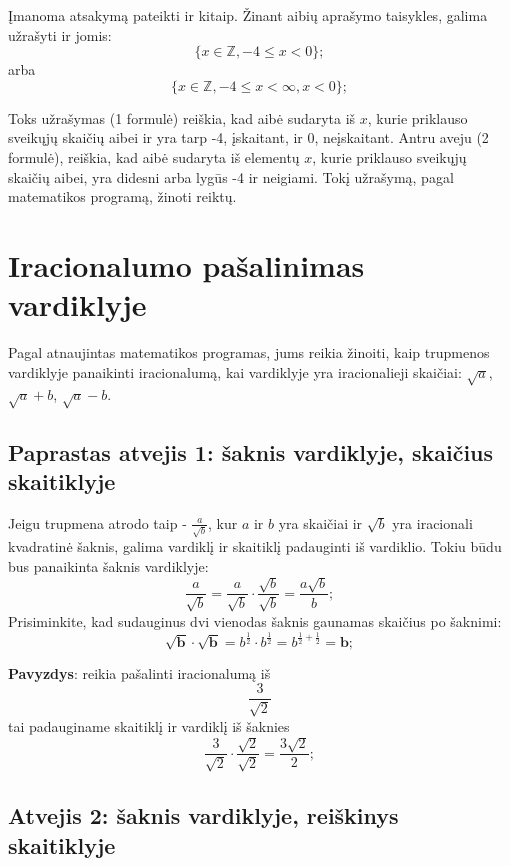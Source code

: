 \documentclass[a4paper]{article}
\begin{document}
Įmanoma atsakymą pateikti ir kitaip. Žinant aibių aprašymo taisykles, galima
užrašyti ir jomis:
\begin{equation}
      \{x \in \mathbb{Z}, -4 \leq x < 0\};
\end{equation}
arba
\begin{equation}
      \{x \in \mathbb{Z}, -4 \leq x < \infty, x < 0\};
\end{equation}

Toks užrašymas (1 formulė) reiškia, kad aibė sudaryta iš $x$, kurie priklauso
sveikųjų skaičių aibei ir yra tarp -4, įskaitant,
ir 0, neįskaitant. Antru aveju (2 formulė), reiškia, kad aibė sudaryta iš
elementų $x$, kurie priklauso sveikųjų skaičių aibei, yra didesni arba lygūs -4
ir neigiami. Tokį užrašymą, pagal matematikos programą, žinoti reiktų.

\section{Iracionalumo pašalinimas vardiklyje}

Pagal atnaujintas matematikos programas, jums reikia žinoiti, kaip trupmenos
vardiklyje panaikinti iracionalumą, kai vardiklyje yra iracionalieji skaičiai:
$\sqrt{a}$, $\sqrt{a}+b$, $\sqrt{a}-b$.

\subsection{Paprastas atvejis 1: šaknis vardiklyje, skaičius skaitiklyje}

Jeigu trupmena atrodo taip - $\frac{a}{\sqrt{b}}$, kur $a$ ir $b$ yra skaičiai
ir $\sqrt{b}$ yra iracionali kvadratinė šaknis, galima vardiklį ir skaitiklį
padauginti iš vardiklio. Tokiu būdu bus panaikinta šaknis vardiklyje:
\[\frac{a}{\sqrt{b}}=\frac{a}{\sqrt{b}}\cdot\frac{\sqrt{b}}{\sqrt{b}}=\frac{a\sqrt{b}}{b};\]
Prisiminkite, kad sudauginus dvi vienodas šaknis gaunamas skaičius po šaknimi:
\[ \pmb{\sqrt{b}\cdot\sqrt{b}}=b^{\frac{1}{2}}\cdot
      b^{\frac{1}{2}}=b^{\frac{1}{2}+\frac{1}{2}}=\pmb{b}; \]

\textbf{Pavyzdys}: reikia pašalinti iracionalumą iš
\[ \frac{3}{\sqrt{2}} \]
tai padauginame skaitiklį ir vardiklį iš šaknies
\[ \frac{3}{\sqrt{2}} \cdot \frac{\sqrt{2}}{\sqrt{2}}= \frac{3\sqrt{2}}{2}; \]

\subsection{Atvejis 2: šaknis vardiklyje, reiškinys skaitiklyje}
\end{document}
